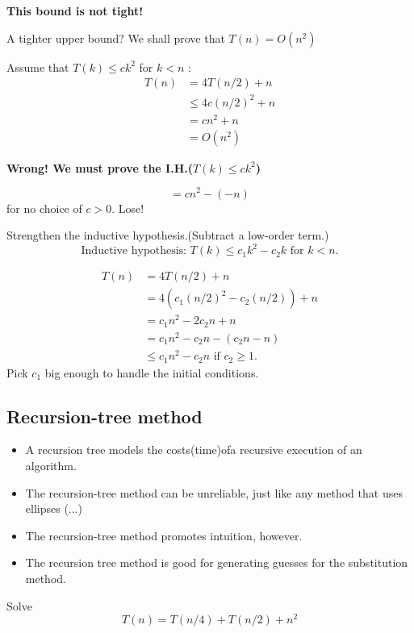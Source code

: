 \documentclass[11pt,toc=twocol]{elegantbook}
\begin{document}
\begin{center}
\textbf{This bound is not tight!}
\end{center}
\begin{note}
  A tighter upper bound? We shall prove that $T(n)=O\left(n^{2}\right)$
\end{note}
Assume that $T(k) \leq c k^{2}$ for $k<n$ :
$$
\begin{aligned}
T(n) &=4 T(n / 2)+n \\
& \leq 4 c(n / 2)^{2}+n \\
&=c n^{2}+n \\
&=O\left(n^{2}\right)
\end{aligned}
$$
\begin{center}
  \textbf{Wrong! We must prove the I.H.($T(k) \leq ck^2$)}
\end{center}
$$
=c n^{2}-(-n)
$$
for no choice of $c>0$. Lose!
\begin{note}
   Strengthen the inductive hypothesis.(Subtract a low-order term.)
  $$
\text { Inductive hypothesis: } T(k) \leq c_{1} k^{2}-c_{2} k \text { for } k<n \text {. }
$$
\end{note}
\begin{solution}
  $$
  \begin{aligned}
  T(n) &=4 T(n / 2)+n \\
  &=4\left(c_{1}(n / 2)^{2}-c_{2}(n / 2)\right)+n \\
  &=c_{1} n^{2}-2 c_{2} n+n \\
  &=c_{1} n^{2}-c_{2} n-\left(c_{2} n-n\right) \\
  & \leq c_{1} n^{2}-c_{2} n \text { if } c_{2} \geq 1 .
  \end{aligned}
  $$
Pick $c_1$ big enough to handle the initial conditions.
\end{solution}
\subsection{Recursion-tree method}
\begin{itemize}
  \item A recursion tree models the costs(time)ofa recursive execution of an algorithm.

  \item The recursion-tree method can be unreliable, just like any method that uses ellipses (...) 
  
  \item The recursion-tree method promotes intuition, however.
  \item The recursion tree method is good for generating guesses for the substitution method.
\end{itemize}
\begin{example}
  Solve 
  $$
  T(n)=T(n / 4)+T(n / 2)+n^{2}
  $$
\end{example}
\end{document}
